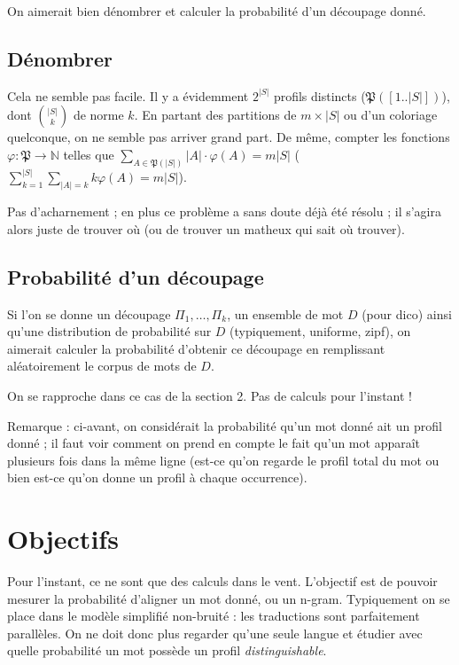 \documentclass{article}
\begin{document}
On aimerait bien dénombrer et calculer la probabilité d'un découpage donné.

\subsection{Dénombrer}
Cela ne semble pas facile. Il y a évidemment $2^{|S|}$ profils distincts ($\mathfrak{P}([1..|S|])$), dont $\binom{|S|}{k}$ de norme $k$. En partant des partitions de $m\times|S|$ ou d'un coloriage quelconque, on ne semble pas arriver grand part. De même, compter les fonctions $\varphi : \mathfrak{P} \longrightarrow \mathbb{N}$ telles que $\sum_{A\in\mathfrak{P}(|S|)} |A|\cdot\varphi(A) = m|S|$
($\sum_{k=1}^{|S|}\sum_{|A|=k}k\varphi(A) = m|S|$).

Pas d'acharnement ; en plus ce problème a sans doute déjà été résolu ; il s'agira alors juste de trouver où (ou de trouver un matheux qui sait où trouver).

\subsection{Probabilité d'un découpage}

Si l'on se donne un découpage $\Pi_1,\dots,\Pi_k$, un ensemble de mot $D$ (pour dico) ainsi qu'une distribution de probabilité sur $D$ (typiquement, uniforme, zipf), on aimerait calculer la probabilité d'obtenir ce découpage en remplissant aléatoirement le corpus de mots de $D$.

On se rapproche dans ce cas de la section 2. Pas de calculs pour l'instant !

Remarque : ci-avant, on considérait la probabilité qu'un mot donné ait un profil donné ; il faut voir comment on prend en compte le fait qu'un mot apparaît plusieurs fois dans la même ligne (est-ce qu'on regarde le profil total du mot ou bien est-ce qu'on donne un profil à chaque occurrence).


\section{Objectifs}

Pour l'instant, ce ne sont que des calculs dans le vent. L'objectif est de pouvoir mesurer la probabilité d'aligner un mot donné, ou un n-gram. Typiquement on se place dans le modèle simplifié non-bruité : les traductions sont parfaitement parallèles. On ne doit donc plus regarder qu'une seule langue et étudier avec quelle probabilité un mot possède un profil \emph{distinguishable}.
\end{document}
